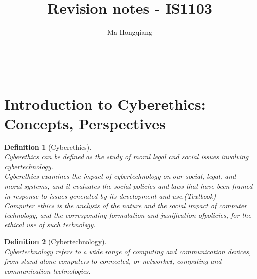\documentclass[12pt]{article}
\newtheorem{definition}{Definition}[section]
\theoremstyle{definition}
\begin{document}
\emergencystretch=\maxdimen
{}
\renewcommand{\@listI}{%
\leftmargin=25pt
\rightmargin=0pt
\labelsep=3pt
\labelwidth=20pt
\itemindent=0pt
\listparindent=0pt
\topsep=0pt plus 2pt minus 4pt
\partopsep=0pt plus 1pt minus 1pt
\parsep=0pt plus 1pt
\itemsep=\parsep
}
\title{Revision notes - IS1103}
\author{Ma Hongqiang}
\maketitle
\tableofcontents

\clearpage

\section{Introduction to Cyberethics: Concepts, Perspectives}
\begin{definition}[Cyberethics]\hfill\\
\normalfont Cyberethics can be defined as the study of moral legal and social issues involving cybertechnology.\\Cyberethics examines the impact of cybertechnology on our social, legal, and moral systems, and it evaluates the social policies and laws that have been framed in response to issues generated by its development and use.(Textbook)\\
Computer ethics is the analysis of the nature and the social impact of computer technology, and the corresponding formulation and justification ofpolicies, for the ethical use of such technology.

\end{definition}
\begin{definition}[Cybertechnology]
\hfill\\\normalfont Cybertechnology refers to a wide range of computing and communication devices, from stand-alone computers to connected, or networked, computing and communication technologies.
\end{definition}
\end{document}
